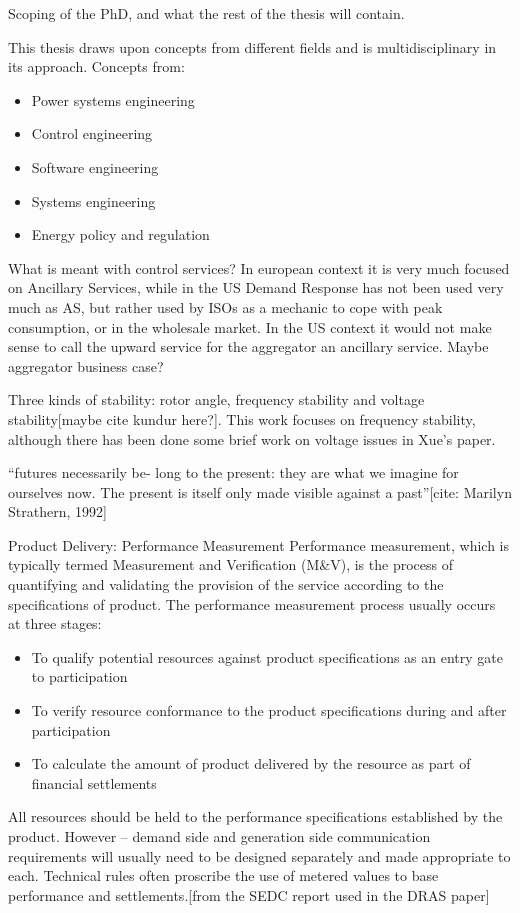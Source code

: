Scoping of the PhD, and what the rest of the thesis will contain.

This thesis draws upon concepts from different fields and is multidisciplinary in its approach. Concepts from:
\begin{itemize}
	\item Power systems engineering
	\item Control engineering
	\item Software engineering
	\item Systems engineering
	\item Energy policy and regulation
\end{itemize}

What is meant with control services? In european context it is very much focused on Ancillary Services, while in the US Demand Response has not been used very much as AS, but rather used by ISOs as a mechanic to cope with peak consumption, or in the wholesale market. In the US context it would not make sense to call the upward service for the aggregator an ancillary service. Maybe aggregator business case?

Three kinds of stability: rotor angle, frequency stability and voltage stability[maybe cite kundur here?]. This work focuses on frequency stability, although there has been done some brief work on voltage issues in Xue's paper. 

``futures necessarily be- long to the present: they are what we imagine for ourselves now. The present is itself only made visible against a past''[cite: Marilyn Strathern, 1992]

Product Delivery: Performance Measurement 
Performance measurement, which is typically termed Measurement and Verification (M\&V), is the process of quantifying and validating the provision of the service according to the specifications of product. The performance measurement process usually occurs at three stages: 
\begin{itemize}
	\item To qualify potential resources against product specifications as an entry gate to participation 
	\item To verify resource conformance to the product specifications during and after participation 
	\item To calculate the amount of product delivered by the resource as part of financial settlements
\end{itemize}
 
All resources should be held to the performance specifications established by the product. However – demand side and generation side communication requirements will usually need to be designed separately and made appropriate to each. Technical rules often proscribe the use of metered values to base performance and settlements.[from the SEDC report used in the DRAS paper]



